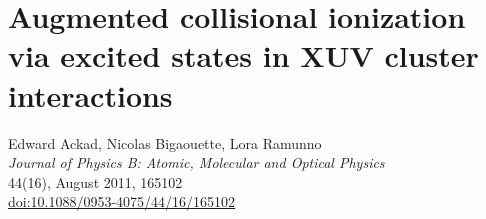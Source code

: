 
\newcommand{\PaperTitleACI}{Augmented collisional ionization via excited states in XUV cluster interactions}

\section{\PaperTitleACI}
\label{section:papers:aci}

\begin{flushright}
Edward Ackad, Nicolas Bigaouette, Lora Ramunno\\
\textit{Journal of Physics B: Atomic, Molecular and Optical Physics}\\
44(16), August 2011, 165102\\
\href{http://dx.doi.org/10.1088/0953-4075/44/16/165102}{doi:10.1088/0953-4075/44/16/165102}
\end{flushright}

\HidePDFAbstractNumber


